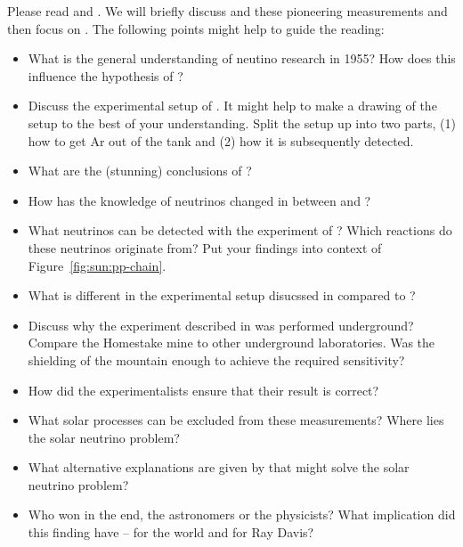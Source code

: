 Please read \citet{davis55} and \citet{bahcall76}. We will briefly discuss \citet{davis55} and these pioneering measurements and then focus on \citet{bahcall76}. The following points might help to guide the reading:
\begin{itemize}
    \item What is the general understanding of neutino research in 1955? How does this influence the hypothesis of \citet{davis55}?
    \item Discuss the experimental setup of \citet{davis55}. It might help to make a drawing of the setup to the best of your understanding. Split the setup up into two parts, (1) how to get Ar out of the tank and (2) how it is subsequently detected.
    \item What are the (stunning) conclusions of \citet{davis55}?
    \item How has the knowledge of neutrinos changed in between \citet{davis55} and \citet{bahcall76}?
    \item What neutrinos can be detected with the experiment of \citet{bahcall76}? Which reactions do these neutrinos originate from? Put your findings into context of Figure~\ref{fig:sun:pp-chain}.
    \item What is different in the experimental setup disucssed in \citet{bahcall76} compared to \citet{davis55}?
    \item Discuss why the experiment described in \citet{bahcall76} was performed underground? Compare the Homestake mine to other underground laboratories. Was the shielding of the mountain enough to achieve the required sensitivity?
    \item How did the experimentalists ensure that their result is correct?
    \item What solar processes can be excluded from these measurements? Where lies the solar neutrino problem?
    \item What alternative explanations are given by \citet{bahcall76} that might solve the solar neutrino problem?
    \item Who won in the end, the astronomers or the physicists? What implication did this finding have -- for the world and for Ray Davis?
\end{itemize}